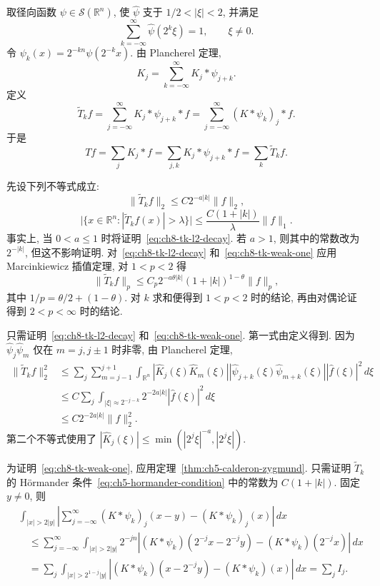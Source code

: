 \begin{Proof}
取径向函数 $\psi\in\mathcal S(\mathbb R^n)$, 使 $\widehat\psi$ 支于 $1/2<|\xi|<2$, 并满足
\[
 \sum_{k=-\infty}^{\infty}\widehat\psi(2^k\xi)=1,
 \qquad \xi\ne0.
\]
令 $\psi_k(x)=2^{-kn}\psi(2^{-k}x)$. 由 Plancherel 定理,
\[
 K_j=\sum_{k=-\infty}^{\infty}K_j*\psi_{j+k}.
\]
定义
\[
 \widetilde T_kf=\sum_{j=-\infty}^{\infty}K_j*\psi_{j+k}*f
 =\sum_{j=-\infty}^{\infty}(K*\psi_k)_j*f.
\]
于是
\[
 Tf=\sum_jK_j*f=\sum_{j,k}K_j*\psi_{j+k}*f
 =\sum_k\widetilde T_kf.
\]

\hypertarget{chapter-08-page-186}{}
先设下列不等式成立:
\begin{equation}
 \|\widetilde T_kf\|_2\le C2^{-a|k|}\|f\|_2,
 \label{eq:ch8-tk-l2-decay}
\end{equation}
\begin{equation}
 \bigl|\{x\in\mathbb R^n:|\widetilde T_kf(x)|>\lambda\}\bigr|
 \le\frac{C(1+|k|)}{\lambda}\|f\|_1.
 \label{eq:ch8-tk-weak-one}
\end{equation}
事实上, 当 $0<a\le1$ 时将证明~\eqref{eq:ch8-tk-l2-decay}. 若 $a>1$, 则其中的常数改为 $2^{-|k|}$, 但这不影响证明. 对~\eqref{eq:ch8-tk-l2-decay} 和~\eqref{eq:ch8-tk-weak-one} 应用 Marcinkiewicz 插值定理, 对 $1<p<2$ 得
\[
 \|\widetilde T_kf\|_p
 \le C_p2^{-a\theta|k|}(1+|k|)^{1-\theta}\|f\|_p,
\]
其中 $1/p=\theta/2+(1-\theta)$. 对 $k$ 求和便得到 $1<p<2$ 时的结论, 再由对偶论证得到 $2<p<\infty$ 时的结论.

只需证明~\eqref{eq:ch8-tk-l2-decay} 和~\eqref{eq:ch8-tk-weak-one}. 第一式由定义得到. 因为 $\widehat\psi_j\widehat\psi_m$ 仅在 $m=j,j\pm1$ 时非零, 由 Plancherel 定理,
\[
 \begin{aligned}
 \|\widetilde T_kf\|_2^2
 &\le\sum_j\sum_{m=j-1}^{j+1}\int_{\mathbb R^n}
 |\widehat K_j(\xi)\widehat K_m(\xi)|
 |\widehat\psi_{j+k}(\xi)\widehat\psi_{m+k}(\xi)|
 |\widehat f(\xi)|^2\,d\xi\\
 &\le C\sum_j\int_{|\xi|\approx2^{-j-k}}2^{-2a|k|}|\widehat f(\xi)|^2\,d\xi\\
 &\le C2^{-2a|k|}\|f\|_2^2.
 \end{aligned}
\]
第二个不等式使用了 $|\widehat K_j(\xi)|\le\min(|2^j\xi|^{-a},|2^j\xi|)$.

为证明~\eqref{eq:ch8-tk-weak-one}, 应用定理~\ref{thm:ch5-calderon-zygmund}. 只需证明 $\widetilde T_k$ 的 Hörmander 条件~\eqref{eq:ch5-hormander-condition} 中的常数为 $C(1+|k|)$. 固定 $y\ne0$, 则
\[
 \begin{aligned}
 &\int_{|x|>2|y|}\left|\sum_{j=-\infty}^{\infty}
 (K*\psi_k)_j(x-y)-(K*\psi_k)_j(x)\right|\,dx\\
 &\quad\le\sum_{j=-\infty}^{\infty}\int_{|x|>2|y|}2^{-jn}
 |(K*\psi_k)(2^{-j}x-2^{-j}y)-(K*\psi_k)(2^{-j}x)|\,dx\\
 &\quad=\sum_j\int_{|x|>2^{1-j}|y|}
 |(K*\psi_k)(x-2^{-j}y)-(K*\psi_k)(x)|\,dx
 =\sum_j I_j.
 \end{aligned}
\]


\end{Proof}
